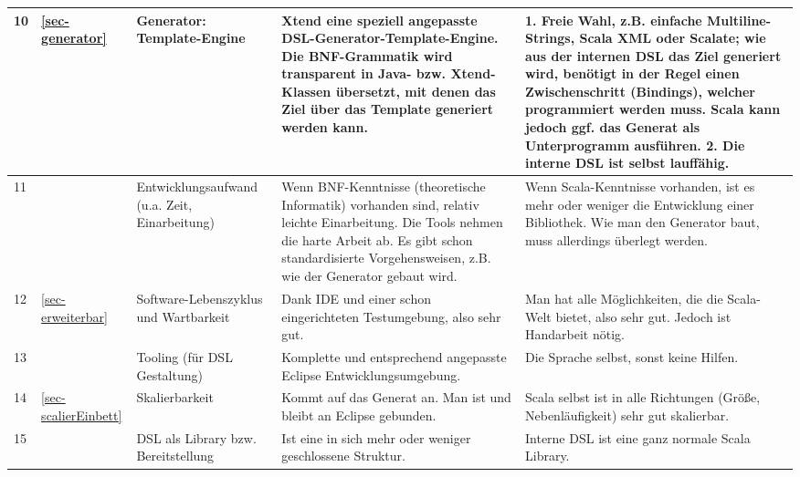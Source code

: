 \begin{landscape}
\begin{longtable}{|p{0.5cm}|p{0.8cm}|p{4.3cm}|p{6.3cm}|p{6.3cm}|}
  10
  & \ref{sec-generator}
  & Generator: Template-Engine
  & {\small Xtend eine speziell angepasste DSL-Generator-Template-Engine.
    Die BNF-Grammatik wird transparent in Java- bzw. Xtend-Klassen übersetzt,
    mit denen das Ziel über das Template generiert werden kann.}
  & {\small 1. Freie Wahl, z.B. einfache Multiline-Strings, Scala XML oder Scalate;
    wie aus der internen DSL das Ziel generiert wird, benötigt in der Regel
    einen Zwischenschritt (Bindings), welcher programmiert werden muss.
    Scala kann jedoch ggf. das Generat als Unterprogramm ausführen.
    2. Die interne DSL ist selbst lauffähig.}
  \\\hline

  11
  &
  & Entwicklungsaufwand (u.a. Zeit, Einarbeitung)
  & {\small Wenn BNF-Kenntnisse (theoretische Informatik) vorhanden sind,
    relativ leichte Einarbeitung.
    Die Tools nehmen die harte Arbeit ab. Es gibt schon standardisierte
    Vorgehensweisen, z.B. wie der Generator gebaut wird.}
  & {\small Wenn Scala-Kenntnisse vorhanden, ist es mehr oder weniger die Entwicklung
    einer Bibliothek.
    Wie man den Generator baut, muss allerdings überlegt werden.}
  \\\hline

  12
  & \ref{sec-erweiterbar}
  & Software-Lebenszyklus und Wartbarkeit
  & {\small Dank IDE und einer schon eingerichteten Testumgebung, also sehr gut.}
  & {\small Man hat alle Möglichkeiten, die die Scala-Welt bietet, also sehr gut.
    Jedoch ist Handarbeit nötig.}
  \\\hline

  13
  &
  & Tooling (für DSL Gestaltung)
  & {\small Komplette und entsprechend angepasste Eclipse Entwicklungsumgebung.}
  & {\small Die Sprache selbst, sonst keine Hilfen.}
  \\\hline

  14
  & \ref{sec-scalierEinbett}
  & Skalierbarkeit
  & {\small Kommt auf das Generat an. Man ist und bleibt an Eclipse gebunden.}
  & {\small Scala selbst ist in alle Richtungen (Größe, Nebenläufigkeit) sehr gut
    skalierbar.}
  \\\hline

  15
  &
  & DSL als Library bzw. Bereitstellung
  & {\small Ist eine in sich mehr oder weniger geschlossene Struktur.}
  & {\small Interne DSL ist eine ganz normale Scala Library.}
  \\\hline

\end{longtable}
\newpage
\end{landscape}


